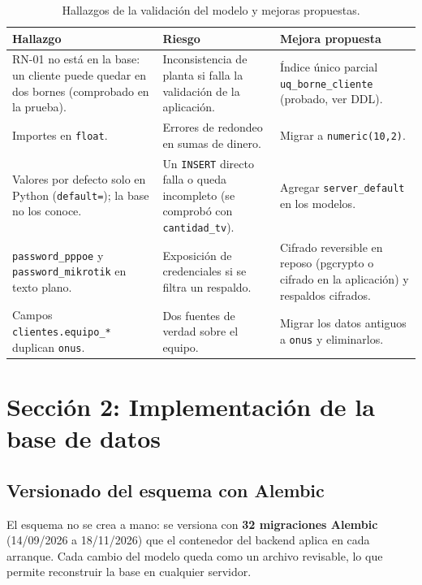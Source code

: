 \begin{table}[htbp]
\centering
\caption{Hallazgos de la validación del modelo y mejoras propuestas.}
\label{tab:ce02-mejoras-bd}
\small
\begin{tabularx}{\textwidth}{L{4cm}XL{3.6cm}}
\toprule
\textbf{Hallazgo} & \textbf{Riesgo} & \textbf{Mejora propuesta} \\
\midrule
RN-01 no está en la base: un cliente puede quedar en dos bornes (comprobado en la prueba). & Inconsistencia de planta si falla la validación de la aplicación. & Índice único parcial \texttt{uq\_borne\_cliente} (probado, ver DDL). \\
Importes en \texttt{float}. & Errores de redondeo en sumas de dinero. & Migrar a \texttt{numeric(10,2)}. \\
Valores por defecto solo en Python (\texttt{default=}); la base no los conoce. & Un \texttt{INSERT} directo falla o queda incompleto (se comprobó con \texttt{cantidad\_tv}). & Agregar \texttt{server\_default} en los modelos. \\
\texttt{password\_pppoe} y \texttt{password\_mikrotik} en texto plano. & Exposición de credenciales si se filtra un respaldo. & Cifrado reversible en reposo (pgcrypto o cifrado en la aplicación) y respaldos cifrados. \\
Campos \texttt{clientes.equipo\_*} duplican \texttt{onus}. & Dos fuentes de verdad sobre el equipo. & Migrar los datos antiguos a \texttt{onus} y eliminarlos. \\
\bottomrule
\end{tabularx}
\end{table}

\section{Sección 2: Implementación de la base de datos}
\label{sec:ce02-implementacion-bd}

\subsection{Versionado del esquema con Alembic}

El esquema no se crea a mano: se versiona con \textbf{32 migraciones Alembic}
(14/09/2026 a 18/11/2026) que el contenedor del backend aplica en cada arranque. Cada
cambio del modelo queda como un archivo revisable, lo que permite reconstruir la
base en cualquier servidor.

